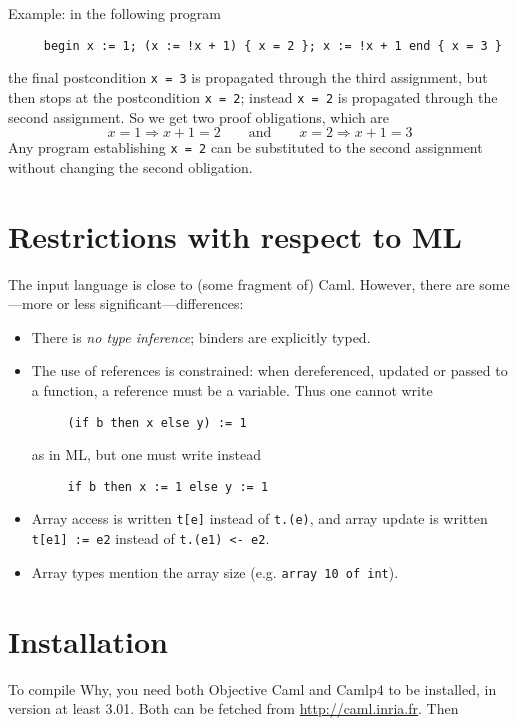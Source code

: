 \documentclass[a4paper,12pt]{report}
\newcommand{\caml}{\textsf{Caml}}
\newcommand{\why}{\textsf{Why}}
\begin{document}
Example: in the following program
\begin{verbatim}
     begin x := 1; (x := !x + 1) { x = 2 }; x := !x + 1 end { x = 3 }
\end{verbatim}
the final postcondition \texttt{x = 3} is propagated through the third
assignment, but then stops at the postcondition \texttt{x = 2};
instead \texttt{x = 2} is propagated through the second
assignment. So we get two proof obligations, which are
\begin{displaymath}
  x=1 \Rightarrow x+1=2 
  \qquad\mbox{and}\qquad
  x=2 \Rightarrow x+1=3
\end{displaymath}
Any program establishing \texttt{x = 2} can be substituted to the
second assignment without changing the second obligation.


\section{Restrictions with respect to ML}
The input language is close to (some fragment of) \caml. However,
there are some---more or less significant---differences:
\begin{itemize}
\item There is \textit{no type inference}; binders are explicitly
  typed. 
\item The use of references is constrained: when dereferenced, updated
  or passed to a function, a reference must be a variable. Thus one
  cannot write
\begin{verbatim}
     (if b then x else y) := 1
\end{verbatim}
as in ML, but one must write instead
\begin{verbatim}
     if b then x := 1 else y := 1
\end{verbatim}
\item Array access is written \texttt{t[e]} instead of \texttt{t.(e)},
  and array update is written \texttt{t[e1] := e2} instead of
  \texttt{t.(e1) <- e2}.
\item Array types mention the array size (e.g. \texttt{array 10 of int}).
\end{itemize}


\section{Installation}
\label{install}

To compile \why, you need both \textsf{Objective Caml} and
\textsf{Camlp4} to be installed, in version at least 3.01. Both can
be fetched from \url{http://caml.inria.fr}.
Then 
\end{document}
